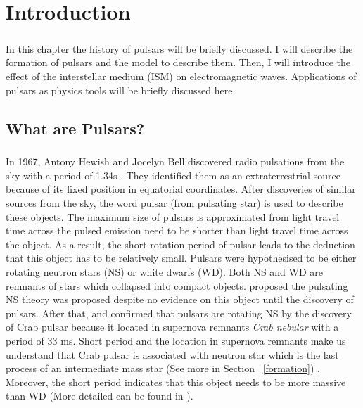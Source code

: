 \documentclass[thesis_msc.tex]{subfiles}
\begin{document}
\chapter{Introduction} \label{intro}
 
     \paragraph{} In this chapter the history of pulsars will be briefly discussed. I will describe the formation of pulsars and the model to describe them. Then, I will introduce the effect of the interstellar medium (ISM) on electromagnetic waves. Applications of pulsars as physics tools will be briefly discussed here. 


    \section{What are Pulsars?}
    \paragraph{} In 1967, Antony Hewish and Jocelyn Bell discovered radio pulsations from the sky with a period of 1.34s \citep{HEWISH1968}. They identified them as an extraterrestrial source because of its fixed position in equatorial coordinates.  After discoveries of similar sources from the sky, the word pulsar (from pulsating star) is used to describe these objects. The maximum size of pulsars is approximated from light travel time across the pulsed emission \citep{HEWISH1968} need to be shorter than light travel time across the object. As a result, the short rotation period of pulsar leads to the deduction that this object has to be relatively small. Pulsars were hypothesised to be either rotating neutron stars (NS) or white dwarfs (WD). Both NS and WD are remnants of stars which collapsed into compact objects. \cite{PhysRev.46.76.2} proposed the pulsating NS theory was proposed despite no evidence on this object until the discovery of pulsars. After that, \cite{PACINI1967} and \cite{GOLD1968} confirmed that pulsars are rotating NS by the discovery of Crab pulsar because it located in supernova remnants \textit{Crab nebular}  with a period of 33 ms. Short period and the location in supernova remnants make us understand that Crab pulsar is associated with neutron star which is the last process of an intermediate mass star (See more in Section ~\ref{formation}) . Moreover, the short period indicates that this object needs to be more massive than WD (More detailed can be found in \cite{GOLD1968}).   
               
\end{document}
